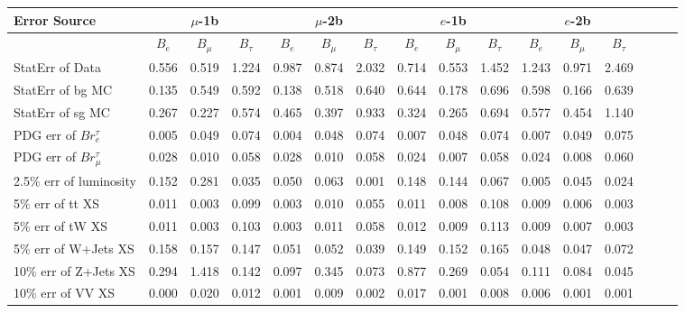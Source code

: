 \begin{sidewaystable}[p]
  \small
  \renewcommand{\arraystretch}{1.2}
  \centering

  \begin{tabular}{|l|ccc|ccc|ccc|ccc|ccc|}
  \hline
  Error Source & \multicolumn{3}{c|}{$\mu$-1b} & \multicolumn{3}{c|}{$\mu$-2b} & \multicolumn{3}{c|}{$e$-1b} & \multicolumn{3}{c|}{$e$-2b} \\
  \hline
                & $B_e$ & $B_\mu$ & $B_\tau$ & $B_e$ & $B_\mu$ & $B_\tau$ & $B_e$ & $B_\mu$ & $B_\tau$ & $B_e$ & $B_\mu$ & $B_\tau$ \\
  \hline
  StatErr of Data                            & 0.556 & 0.519 & 1.224 & 0.987 & 0.874 & 2.032 & 0.714 & 0.553 & 1.452 & 1.243 & 0.971 & 2.469 \\ 
  StatErr of bg MC                           & 0.135 & 0.549 & 0.592 & 0.138 & 0.518 & 0.640 & 0.644 & 0.178 & 0.696 & 0.598 & 0.166 & 0.639 \\ 
  StatErr of sg MC                           & 0.267 & 0.227 & 0.574 & 0.465 & 0.397 & 0.933 & 0.324 & 0.265 & 0.694 & 0.577 & 0.454 & 1.140 \\ 
  \hline
  PDG err of $Br^\tau_e$                     & 0.005 & 0.049 & 0.074 & 0.004 & 0.048 & 0.074 & 0.007 & 0.048 & 0.074 & 0.007 & 0.049 & 0.075 \\ 
  PDG err of $Br^\tau_\mu$                   & 0.028 & 0.010 & 0.058 & 0.028 & 0.010 & 0.058 & 0.024 & 0.007 & 0.058 & 0.024 & 0.008 & 0.060 \\ 
  2.5$\%$ err of luminosity                  & 0.152 & 0.281 & 0.035 & 0.050 & 0.063 & 0.001 & 0.148 & 0.144 & 0.067 & 0.005 & 0.045 & 0.024 \\ 
  5$\%$ err of tt XS                         & 0.011 & 0.003 & 0.099 & 0.003 & 0.010 & 0.055 & 0.011 & 0.008 & 0.108 & 0.009 & 0.006 & 0.003 \\ 
  5$\%$ err of tW XS                         & 0.011 & 0.003 & 0.103 & 0.003 & 0.011 & 0.058 & 0.012 & 0.009 & 0.113 & 0.009 & 0.007 & 0.003 \\ 
  5$\%$ err of W+Jets XS                     & 0.158 & 0.157 & 0.147 & 0.051 & 0.052 & 0.039 & 0.149 & 0.152 & 0.165 & 0.048 & 0.047 & 0.072 \\ 
  10$\%$ err of Z+Jets XS                    & 0.294 & 1.418 & 0.142 & 0.097 & 0.345 & 0.073 & 0.877 & 0.269 & 0.054 & 0.111 & 0.084 & 0.045 \\ 
  10$\%$ err of VV XS                        & 0.000 & 0.020 & 0.012 & 0.001 & 0.009 & 0.002 & 0.017 & 0.001 & 0.008 & 0.006 & 0.001 & 0.001 \\ 

\end{tabular}
\end{sidewaystable}
